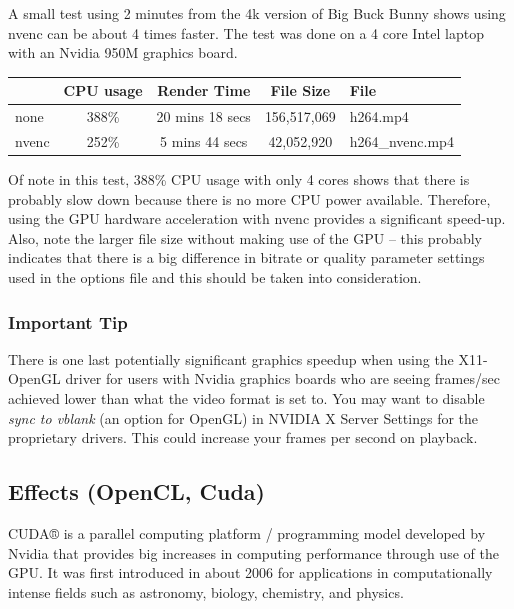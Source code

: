 A small test using 2 minutes from the 4k version of Big Buck Bunny shows using nvenc can be about 4 times faster.  The test was done on a 4 core Intel laptop with an Nvidia 950M graphics board.

\begin{center}
	\begin{tabular}{l|cccl}
		&CPU usage & Render Time & File Size & File \\
		\hline
		none & 388\% &20 mins 18 secs & 156,517,069 & h264.mp4 \\
		nvenc & 252\% & 5 mins 44 secs & 42,052,920 & h264\_nvenc.mp4 \\
	\end{tabular}
\end{center}

Of note in this test, 388\% CPU usage with only 4 cores shows that there is probably slow down because there is no more CPU power available. Therefore, using the GPU hardware acceleration with nvenc provides a significant speed-up.  Also, note the larger file size without making use of the GPU – this probably indicates that there is a big difference in bitrate or quality parameter settings used in the options file and this should be taken into consideration.

\subsubsection*{Important Tip}%
\label{ssub:important_tip}

There is one last potentially significant graphics speedup when using the X11-OpenGL driver for users with Nvidia graphics boards who are seeing frames/sec achieved lower than what the video format is set to.  You may want to disable \textit{sync to vblank} (an option for OpenGL) in NVIDIA X Server Settings for the proprietary drivers.  This could increase your frames per second on playback.

\subsection{Effects (OpenCL, Cuda)}%
\label{sub:effects_opencl_cuda}

CUDA® is a parallel computing platform / programming model developed by Nvidia that provides big increases in computing performance through use of the GPU. It was first introduced in about 2006 for applications in computationally intense fields such as astronomy, biology, chemistry, and physics.

